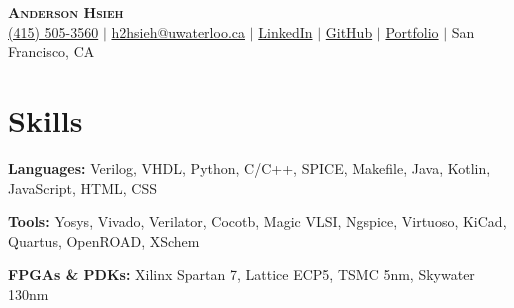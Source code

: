 \documentclass[letterpaper,11pt]{article}
\newcommand{\resumeSubHeadingListStart}{\begin{itemize}[leftmargin=0pt, label={}]}
\newcommand{\resumeSubHeadingListEnd}{\end{itemize}}
\newcommand{\resumeSectionName}[1]{\section{#1}\vspace{2pt}}
\begin{document}
\selectfont
\newcommand{\resumeProjectHeading}[2]{
    \vspace{-2pt}\item
    \begin{tabular*}{0.97\textwidth}{l@{\extracolsep{\fill}}r}
      \small#1 & #2 \\
    \end{tabular*}\vspace{-7pt}
}


\begin{center}
    \textbf{\Huge \scshape Anderson Hsieh} \\ \vspace{6pt}
    \small
    \faMobile \hspace{.5pt} \href{tel:6472360919}{(415) 505-3560}
    $|$
    \faAt \hspace{.5pt} \href{mailto:h2hsieh@uwaterloo.ca}{h2hsieh@uwaterloo.ca}
    $|$
    \faLinkedinSquare \hspace{.5pt} \href{https://www.linkedin.com/in/anderson-hsieh-6003a41ba/}{LinkedIn}
    $|$
    \faGithub \hspace{.5pt} \href{https://github.com/AndersonHsieh0330}{GitHub}
    $|$
    \faPictureO \hspace{.5pt} \href{https://docs.google.com/presentation/d/1Au0XCNEH63rdX4fkEn1Miv1jgYVPYybsGhhVmXHV-4A/edit?usp=sharing}{Portfolio}
    $|$
    \faMapMarker \hspace{.5pt} {San Francisco, CA}
\end{center}



\resumeSectionName{Skills}
  \resumeSubHeadingListStart
    \small{\item{
            \textbf{Languages: }{Verilog, VHDL, Python, C/C++, SPICE, Makefile, Java, Kotlin, JavaScript, HTML, CSS } \\ \vspace{2pt}

        \textbf{Tools: }{Yosys, Vivado, Verilator, Cocotb, Magic VLSI, Ngspice, Virtuoso, KiCad, Quartus, OpenROAD, XSchem} \\ \vspace{2pt}

        \textbf{FPGAs \& PDKs: }{Xilinx Spartan 7, Lattice ECP5, TSMC 5nm, Skywater 130nm} \\ 
        }
    }
  \resumeSubHeadingListEnd
\end{document}
